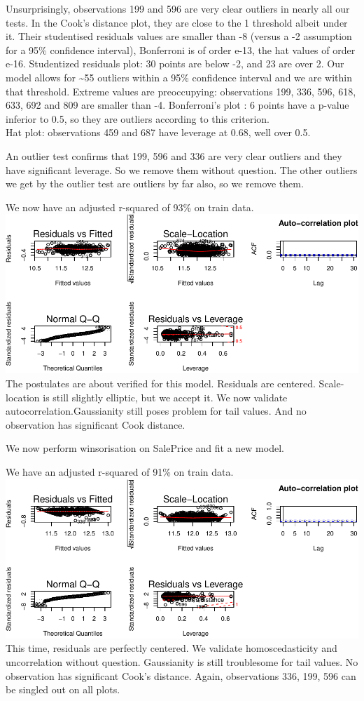 \documentclass[]{article}
\begin{document}
Unsurprisingly, observations 199 and 596 are very clear outliers in
nearly all our tests. In the Cook's distance plot, they are close to the
1 threshold albeit under it. Their studentised residuals values are
smaller than -8 (versus a -2 assumption for a 95\% confidence interval),
Bonferroni is of order e-13, the hat values of order e-16. Studentized
residuals plot: 30 points are below -2, and 23 are over 2. Our model
allows for \textasciitilde{}55 outliers within a 95\% confidence
interval and we are within that threshold. Extreme values are
preoccupying: observations 199, 336, 596, 618, 633, 692 and 809 are
smaller than -4. Bonferroni's plot : 6 points have a p-value inferior to
0.5, so they are outliers according to this criterion.\\
Hat plot: observations 459 and 687 have leverage at 0.68, well over 0.5.

An outlier test confirms that 199, 596 and 336 are very clear outliers
and they have significant leverage. So we remove them without question.
The other outliers we get by the outlier test are outliers by far also,
so we remove them.

We now have an adjusted r-squared of 93\% on train data.\\
\includegraphics{r_file_v5_files/figure-latex/unnamed-chunk-34-1.pdf}
The postulates are about verified for this model. Residuals are
centered. Scale-location is still slightly elliptic, but we accept it.
We now validate autocorrelation.Gaussianity still poses problem for tail
values. And no observation has significant Cook distance.

We now perform winsorisation on SalePrice and fit a new model.

We have an adjusted r-squared of 91\% on train data.
\includegraphics{r_file_v5_files/figure-latex/unnamed-chunk-37-1.pdf}
This time, residuals are perfectly centered. We validate
homoscedasticity and uncorrelation without question. Gaussianity is
still troublesome for tail values. No observation has significant Cook's
distance. Again, observations 336, 199, 596 can be singled out on all
plots.
\end{document}
